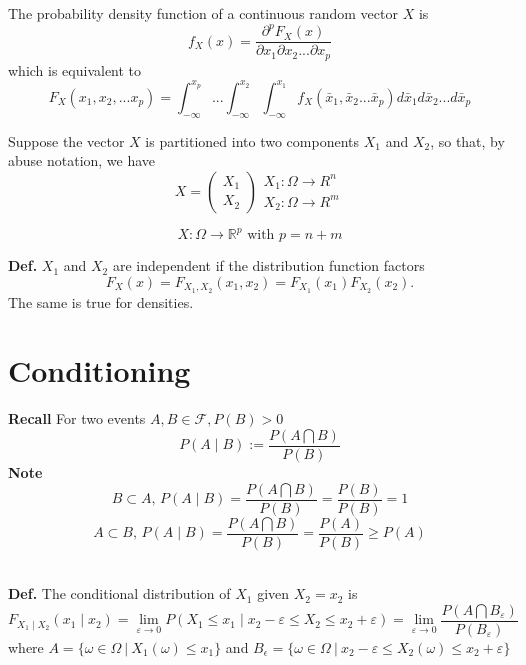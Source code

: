 \documentclass{article}
\newcommand{\real}{\mathbb R}  %
\begin{document}
        \noindent
        The probability density function of a continuous random vector $X$ is
                $$f_X(x)= \frac{\partial^p F_X(x)}{\partial x_1 \partial x_2 ... \partial x_p}$$
         which is equivalent to
         $$F_X(x_1,x_2,...x_p)=\int_{-\infty}^{x_p} ... \int_{-\infty}^{x_2} \int_{-\infty}^{x_1}f_X(\bar{x}_1,\bar{x}_2...\bar{x}_p) d \bar{x}_1 d \bar{x}_2 ... d \bar{x}_p$$

        \noindent
        Suppose the vector $X$ is partitioned into two components $X_1$ and $X_2$, so that, by abuse notation, we have $$ X = \left( \begin{array}{cc} X_1 \\
                                               X_2 \end{array} \right)
                             \begin{array}{cc} X_1 : \Omega \rightarrow R^n \\
                                               X_2 : \Omega \rightarrow R^m \end{array}$$

        $$ X: \Omega \rightarrow \real^p \mbox{ with } p = n+m $$

        \noindent
        \textbf{Def. }$X_1$ and $X_2$ are independent if the distribution function factors
        $$F_X(x)=F_{X_1,X_2}(x_1,x_2)=F_{X_1}(x_1)F_{X_2}(x_2).$$
        The same is true for densities.\\

         \noindent
        \section{Conditioning}

        \noindent
        \textbf{Recall} For two events $A,B \in \mathscr{F}, P(B) > 0$
        $$P(A \mid B):=\frac{P(A\bigcap B)}{P(B)}$$
        \noindent
        \textbf{Note}
        $$B\subset A \mbox{, } P(A \mid B)=\frac{P(A\bigcap B)}{P(B)}=\frac{P(B)}{P(B)}=1$$
        $$A\subset B \mbox{, } P(A \mid B)=\frac{P(A\bigcap B)}{P(B)}=\frac{P(A)}{P(B)}\ge P(A)$$

\newpage
        \noindent
        \\
          \textbf{Def.} The conditional distribution of $X_1$ given $X_2 = x_2$ is
        $$F_{X_1 \mid X_2}(x_1 \mid x_2)=\lim\limits_{\varepsilon \rightarrow 0}P(X_1 \le x_1 \mid x_2-\varepsilon \le X_2 \le x_2+\varepsilon)=\lim\limits_{\varepsilon \rightarrow 0}\frac{P(A\bigcap B_\varepsilon)}{P(B_\varepsilon)}$$
        where
        $A=\{\omega \in \Omega~|~ X_1(\omega) \le x_1\}$ and $B_\epsilon=\{ \omega \in \Omega~|~ x_2-\varepsilon \le X_2(\omega) \le x_2+\varepsilon \}$
\end{document}
